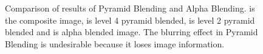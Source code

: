 \begin{figure}[H]
\caption[Alpha Blending versus Pyramid Blending]{Comparison of results of Pyramid Blending and Alpha Blending.  is the composite image,  is level 4 pyramid blended,  is level 2 pyramid blended and  is alpha blended image. The blurring effect in Pyramid Blending is undesirable because it loses image information.}%
\label{fig:alpha-vs-pyramid}%
\end{figure}

